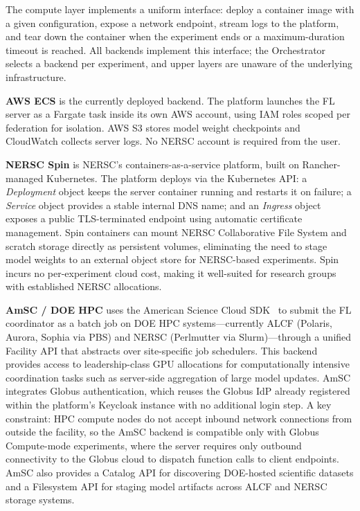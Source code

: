 \documentclass[conference]{IEEEtran}
\begin{document}
The compute layer implements a uniform interface: deploy a container
image with a given configuration, expose a network endpoint, stream
logs to the platform, and tear down the container when the experiment
ends or a maximum-duration timeout is reached. All backends implement
this interface; the Orchestrator selects a backend per experiment, and
upper layers are unaware of the underlying infrastructure.

\textbf{AWS ECS} is the currently deployed backend. The platform
launches the FL server as a Fargate task inside its own AWS account,
using IAM roles scoped per federation for isolation. AWS S3 stores
model weight checkpoints and CloudWatch collects server logs. No NERSC
account is required from the user.

\textbf{NERSC Spin} is NERSC's containers-as-a-service platform, built
on Rancher-managed Kubernetes. The platform deploys via the Kubernetes
API: a \textit{Deployment} object keeps the server container running
and restarts it on failure; a \textit{Service} object provides a
stable internal DNS name; and an \textit{Ingress} object exposes a
public TLS-terminated endpoint using automatic certificate management.
Spin containers can mount NERSC Collaborative File System and scratch
storage directly as persistent volumes, eliminating the need to stage
model weights to an external object store for NERSC-based experiments.
Spin incurs no per-experiment cloud cost, making it well-suited for
research groups with established NERSC allocations.

\textbf{AmSC / DOE HPC} uses the American Science Cloud
SDK~\cite{amsc} to submit the FL coordinator as a batch job on DOE
HPC systems---currently ALCF (Polaris, Aurora, Sophia via PBS) and
NERSC (Perlmutter via Slurm)---through a unified Facility API that
abstracts over site-specific job schedulers. This backend provides
access to leadership-class GPU allocations for computationally
intensive coordination tasks such as server-side aggregation of large
model updates. AmSC integrates Globus authentication, which reuses the
Globus IdP already registered within the platform's Keycloak instance
with no additional login step. A key constraint: HPC compute nodes
do not accept inbound network connections from outside the facility,
so the AmSC backend is compatible only with Globus Compute-mode
experiments, where the server requires only outbound connectivity to
the Globus cloud to dispatch function calls to client endpoints.
AmSC also provides a Catalog API for discovering DOE-hosted scientific
datasets and a Filesystem API for staging model artifacts across ALCF
and NERSC storage systems.
\end{document}
